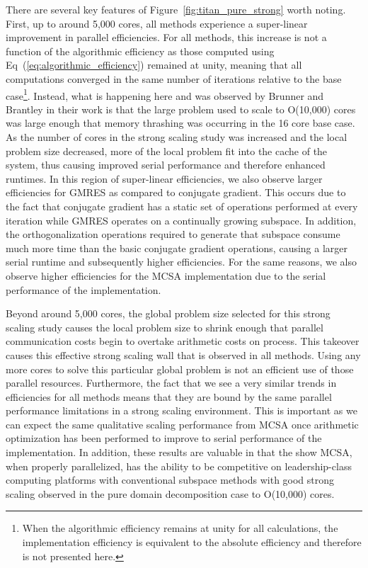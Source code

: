 There are several key features of Figure~\ref{fig:titan_pure_strong}
worth noting. First, up to around 5,000 cores, all methods experience
a super-linear improvement in parallel efficiencies. For all methods,
this increase is not a function of the algorithmic efficiency as those
computed using Eq~(\ref{eq:algorithmic_efficiency}) remained at unity,
meaning that all computations converged in the same number of
iterations relative to the base case\footnote{When the algorithmic
  efficiency remains at unity for all calculations, the implementation
  efficiency is equivalent to the absolute efficiency and therefore is
  not presented here.}. Instead, what is happening here and was
observed by Brunner and Brantley in their work is that the large
problem used to scale to O(10,000) cores was large enough that memory
thrashing was occurring in the 16 core base case. As the number of
cores in the strong scaling study was increased and the local problem
size decreased, more of the local problem fit into the cache of the
system, thus causing improved serial performance and therefore
enhanced runtimes. In this region of super-linear efficiencies, we
also observe larger efficiencies for GMRES as compared to conjugate
gradient. This occurs due to the fact that conjugate gradient has a
static set of operations performed at every iteration while GMRES
operates on a continually growing subspace. In addition, the
orthogonalization operations required to generate that subspace
consume much more time than the basic conjugate gradient operations,
causing a larger serial runtime and subsequently higher
efficiencies. For the same reasons, we also observe higher
efficiencies for the MCSA implementation due to the serial performance
of the implementation.

Beyond around 5,000 cores, the global problem size selected for this
strong scaling study causes the local problem size to shrink enough
that parallel communication costs begin to overtake arithmetic costs
on process. This takeover causes this effective strong scaling wall
that is observed in all methods. Using any more cores to solve this
particular global problem is not an efficient use of those parallel
resources. Furthermore, the fact that we see a very similar trends in
efficiencies for all methods means that they are bound by the same
parallel performance limitations in a strong scaling environment. This
is important as we can expect the same qualitative scaling performance
from MCSA once arithmetic optimization has been performed to improve to
serial performance of the implementation. In addition, these results
are valuable in that the show MCSA, when properly parallelized, has
the ability to be competitive on leadership-class computing platforms
with conventional subspace methods with good strong scaling observed
in the pure domain decomposition case to O(10,000) cores.

